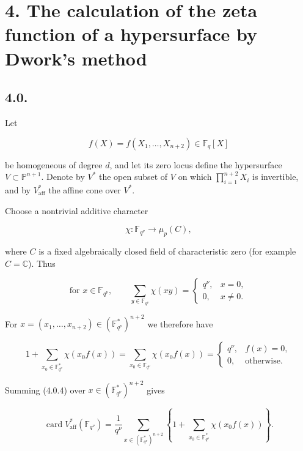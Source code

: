 \section*{4. The calculation of the zeta function of a hypersurface by
Dwork's method}

\subsection*{4.0.}
Let

\begin{equation}\tag{4.0.1}
f(X)=f(X_1,\ldots,X_{n+2})\in\mathbb F_q[X]
\end{equation}

be homogeneous of degree $d$, and let its zero locus define the hypersurface
$V\subset\mathbb P^{n+1}$. Denote by $V^*$ the open subset of $V$ on which
$\prod_{i=1}^{n+2}X_i$ is invertible, and by $V^*_{\mathrm{aff}}$ the affine
cone over $V^*$.

Choose a nontrivial additive character

\begin{equation}\tag{4.0.2}
\chi:\mathbb F_{q^\nu}\longrightarrow\mu_p(C),
\end{equation}

where $C$ is a fixed algebraically closed field of characteristic zero (for
example $C=\mathbb C$). Thus

\begin{equation}\tag{4.0.3}
\text{for }x\in\mathbb F_{q^\nu},\qquad
\sum_{y\in\mathbb F_{q^\nu}}\chi(xy)=
\begin{cases}
q^\nu,&x=0,\\
0,&x\ne0.
\end{cases}
\end{equation}

For $x=(x_1,\ldots,x_{n+2})\in(\mathbb F_{q^\nu}^*)^{n+2}$ we therefore
have

\begin{equation}\tag{4.0.4}
1+\sum_{x_0\in\mathbb F_{q^\nu}^*}\chi(x_0f(x))
=\sum_{x_0\in\mathbb F_{q^\nu}}\chi(x_0f(x))
=
\begin{cases}
q^\nu,&f(x)=0,\\
0,&\text{otherwise}.
\end{cases}
\end{equation}

Summing (4.0.4) over $x\in(\mathbb F_{q^\nu}^*)^{n+2}$ gives

\begin{equation}\tag{4.0.5}
\operatorname{card}V^*_{\mathrm{aff}}(\mathbb F_{q^\nu})
=\frac1{q^\nu}
\sum_{x\in(\mathbb F_{q^\nu}^*)^{n+2}}
\left\{1+\sum_{x_0\in\mathbb F_{q^\nu}^*}\chi(x_0f(x))\right\}.
\end{equation}

